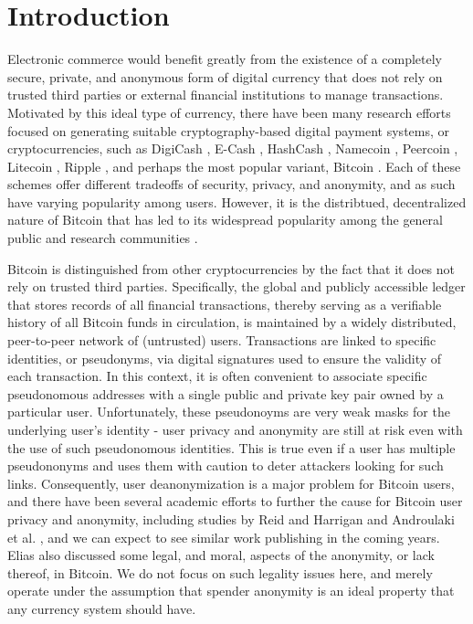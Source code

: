 \section{Introduction}

Electronic commerce would benefit greatly from the existence of a completely secure, private, and anonymous form of digital currency that does not rely on trusted third parties or external financial institutions to manage transactions. Motivated by this ideal type of currency, there have been many research efforts focused on generating suitable cryptography-based digital payment systems, or cryptocurrencies, such as DigiCash \cite{digicash}, E-Cash \cite{ecash}, HashCash \cite{hashcash}, Namecoin \cite{namecoin}, Peercoin \cite{peercoin}, Litecoin \cite{litecoin}, Ripple \cite{ripple}, and perhaps the most popular variant, Bitcoin \cite{bitcoin}. Each of these schemes offer different tradeoffs of security, privacy, and anonymity, and as such have varying popularity among users. However, it is the distribtued, decentralized nature of Bitcoin that has led to its widespread popularity among the general public and research communities \cite{news articles}. 

Bitcoin is distinguished from other cryptocurrencies by the fact that it does not rely on trusted third parties. Specifically, the global and publicly accessible ledger that stores records of all financial transactions, thereby serving as a verifiable history of all Bitcoin funds in circulation, is maintained by a widely distributed, peer-to-peer network of (untrusted) users. Transactions are linked to specific identities, or pseudonyms, via digital signatures used to ensure the validity of each transaction. In this context, it is often convenient to associate specific pseudonomous addresses with a single public and private key pair owned by a particular user. Unfortunately, these pseudonoyms are very weak masks for the underlying user's identity - user privacy and anonymity are still at risk even with the use of such pseudonomous identities. This is true even if a user has multiple pseudononyms and uses them with caution to deter attackers looking for such links. Consequently, user deanonymization is a major problem for Bitcoin users, and there have been several academic efforts to further the cause for Bitcoin user privacy and anonymity, including studies by Reid and Harrigan \cite{ReidHarrigan13} and Androulaki et al. \cite{Androulaki12-privacy}, and we can expect to see similar work publishing in the coming years. Elias \cite{8} also discussed some legal, and moral, aspects of the anonymity, or lack thereof, in Bitcoin. We do not focus on such legality issues here, and merely operate under the assumption that spender anonymity is an ideal property that any currency system should have.

